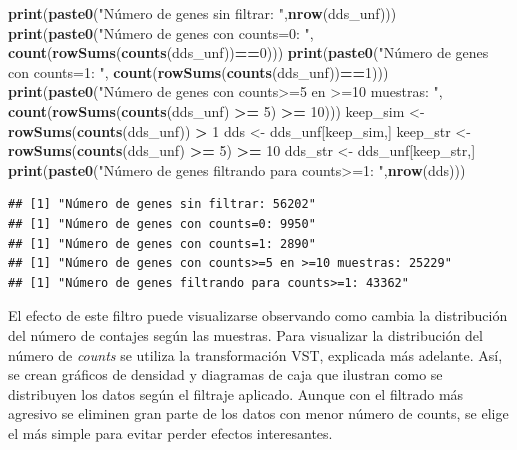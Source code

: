 \documentclass[
]{article}
\newenvironment{Shaded}{\begin{snugshade}}{\end{snugshade}}
\newcommand{\DecValTok}[1]{\textcolor[rgb]{0.00,0.00,0.81}{#1}}
\newcommand{\KeywordTok}[1]{\textcolor[rgb]{0.13,0.29,0.53}{\textbf{#1}}}
\newcommand{\NormalTok}[1]{#1}
\newcommand{\OperatorTok}[1]{\textcolor[rgb]{0.81,0.36,0.00}{\textbf{#1}}}
\newcommand{\StringTok}[1]{\textcolor[rgb]{0.31,0.60,0.02}{#1}}
\begin{document}
\begin{Shaded}
\begin{Highlighting}[]
\KeywordTok{print}\NormalTok{(}\KeywordTok{paste0}\NormalTok{(}\StringTok{"Número de genes sin filtrar: "}\NormalTok{,}\KeywordTok{nrow}\NormalTok{(dds_unf)))}
\KeywordTok{print}\NormalTok{(}\KeywordTok{paste0}\NormalTok{(}\StringTok{"Número de genes con counts=0: "}\NormalTok{,}
             \KeywordTok{count}\NormalTok{(}\KeywordTok{rowSums}\NormalTok{(}\KeywordTok{counts}\NormalTok{(dds_unf))}\OperatorTok{==}\DecValTok{0}\NormalTok{)))}
\KeywordTok{print}\NormalTok{(}\KeywordTok{paste0}\NormalTok{(}\StringTok{"Número de genes con counts=1: "}\NormalTok{,}
             \KeywordTok{count}\NormalTok{(}\KeywordTok{rowSums}\NormalTok{(}\KeywordTok{counts}\NormalTok{(dds_unf))}\OperatorTok{==}\DecValTok{1}\NormalTok{)))}
\KeywordTok{print}\NormalTok{(}\KeywordTok{paste0}\NormalTok{(}\StringTok{"Número de genes con counts>=5 en >=10 muestras: "}\NormalTok{,}
             \KeywordTok{count}\NormalTok{(}\KeywordTok{rowSums}\NormalTok{(}\KeywordTok{counts}\NormalTok{(dds_unf) }\OperatorTok{>=}\StringTok{ }\DecValTok{5}\NormalTok{) }\OperatorTok{>=}\StringTok{ }\DecValTok{10}\NormalTok{)))}
\NormalTok{keep_sim <-}\StringTok{ }\KeywordTok{rowSums}\NormalTok{(}\KeywordTok{counts}\NormalTok{(dds_unf)) }\OperatorTok{>}\StringTok{ }\DecValTok{1}
\NormalTok{dds <-}\StringTok{ }\NormalTok{dds_unf[keep_sim,]}
\NormalTok{keep_str <-}\StringTok{ }\KeywordTok{rowSums}\NormalTok{(}\KeywordTok{counts}\NormalTok{(dds_unf) }\OperatorTok{>=}\StringTok{ }\DecValTok{5}\NormalTok{) }\OperatorTok{>=}\StringTok{ }\DecValTok{10}
\NormalTok{dds_str <-}\StringTok{ }\NormalTok{dds_unf[keep_str,]}
\KeywordTok{print}\NormalTok{(}\KeywordTok{paste0}\NormalTok{(}\StringTok{"Número de genes filtrando para counts>=1: "}\NormalTok{,}\KeywordTok{nrow}\NormalTok{(dds)))}
\end{Highlighting}
\end{Shaded}

\begin{verbatim}
## [1] "Número de genes sin filtrar: 56202"
## [1] "Número de genes con counts=0: 9950"
## [1] "Número de genes con counts=1: 2890"
## [1] "Número de genes con counts>=5 en >=10 muestras: 25229"
## [1] "Número de genes filtrando para counts>=1: 43362"
\end{verbatim}

El efecto de este filtro puede visualizarse observando como cambia la
distribución del número de contajes según las muestras. Para visualizar
la distribución del número de \emph{counts} se utiliza la transformación
VST, explicada más adelante. Así, se crean gráficos de densidad y
diagramas de caja que ilustran como se distribuyen los datos según el
filtraje aplicado. Aunque con el filtrado más agresivo se eliminen gran
parte de los datos con menor número de counts, se elige el más simple
para evitar perder efectos interesantes.
\end{document}
